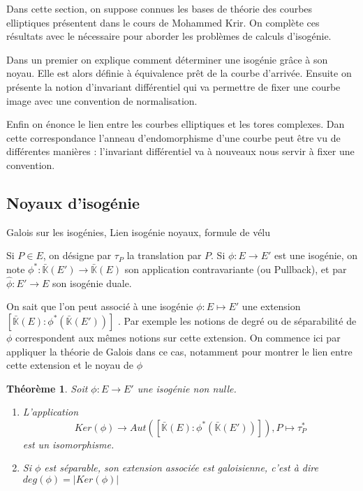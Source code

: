 \documentclass{article}
\newcommand{\K}[0]{\mathbb{K}}
\newcommand{\Kb}[0]{\bar{\K}}
\newtheorem{The}{Théorème}[section]
\begin{document}
Dans cette section, on suppose connues les bases de théorie des courbes elliptiques présentent dans le cours de Mohammed Krir. On complète ces résultats avec le nécessaire pour aborder les problèmes de calculs d'isogénie. 

Dans un premier on explique comment déterminer une isogénie grâce à son noyau. Elle est alors définie à équivalence prêt de la courbe d'arrivée. Ensuite on présente la notion d'invariant différentiel qui va permettre de fixer une courbe image avec une convention de normalisation. 

Enfin on énonce le lien entre les courbes elliptiques et les tores complexes. Dan cette correspondance l’anneau d'endomorphisme d'une courbe peut être vu de différentes manières : l'invariant différentiel va à nouveaux nous servir à fixer une convention. 

\subsection{Noyaux d'isogénie}
Galois sur les isogénies, Lien isogénie noyaux, formule de vélu

Si $P\in E$, on désigne par $\tau_{P}$ la translation par $P$. Si $\phi : E\rightarrow E'$ est une isogénie, on note $\phi^{*} : \Kb(E') \rightarrow \Kb(E)$ son application contravariante (ou Pullback), et par $\hat{\phi} : E'\rightarrow E$ son isogénie duale.

On sait que l'on peut associé à une isogénie $\phi : E\mapsto E'$ une extension $\left[ \Kb(E) : \phi^{*}\left( \Kb(E')\right) \right]$ . Par exemple les notions de degré ou de séparabilité de $\phi$ correspondent aux mêmes notions sur cette extension. On commence ici par appliquer la théorie de Galois dans ce cas, notamment pour montrer le lien entre cette extension et le noyau de $\phi$


\begin{The}
	Soit $\phi : E\rightarrow E'$ une isogénie non nulle. 
	\begin{enumerate}
		\item L'application 
			\begin{equation*}
				Ker(\phi) \rightarrow Aut\left( \left[ \Kb(E) : \phi^{*}\left( \Kb(E')\right) \right] \right) , P\mapsto \tau_{P}^{*}
			\end{equation*} 
			est un isomorphisme.
		\item Si $\phi$ est séparable, son extension associée est galoisienne, c'est à dire $deg(\phi) = |Ker(\phi)|$
	\end{enumerate}
\end{The}
\end{document}
